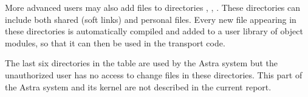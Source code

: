 More advanced users may also add files to directories
, , .
These directories can include both shared (soft links) and personal files.
Every new file appearing in these directories is automatically
compiled and added to a user library of object modules, so that
it can then be used in the transport code.

The last six directories in the table are used by the Astra system
but the unauthorized user has no access to change files in these
directories.
This part of the Astra system and its kernel are not described 
in the current report.

\vfill\eject
